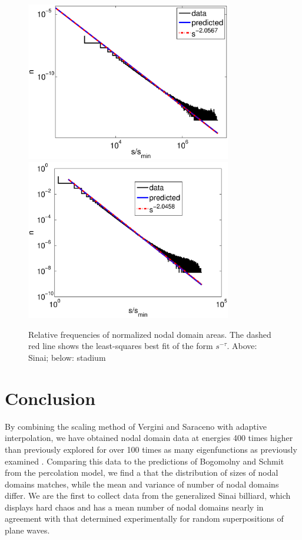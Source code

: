 \documentclass{report}
\begin{document}
\begin{figure}
  \begin{center}
    \includegraphics[width=0.8\textwidth]{figs/results/qugrs_1000_to_1100_sizes.eps}
    \includegraphics[width=0.8\textwidth]{figs/results/qust_700_to_900_sizes_0.1_sampled.eps}
    \caption{Relative frequencies of normalized nodal domain areas. The dashed red line shows the least-squares best fit of the form $s^{-\tau}$. Above: Sinai; below: stadium}
    \label{fig:area}
  \end{center}
\end{figure}

\chapter{Conclusion}
By combining the scaling method of Vergini and Saraceno \cite{vergini} with adaptive interpolation, we have obtained nodal domain data at energies 400 times higher than previously explored for over 100 times as many eigenfunctions as previously examined \cite{bogomolny07}. Comparing this data to the predictions of Bogomolny and Schmit \cite{bogomolny} from the percolation model, we find a that the distribution of sizes of nodal domains matches, while the mean and variance of number of nodal domains differ. We are the first to collect data from the generalized Sinai billiard, which displays hard chaos and has a mean number of nodal domains nearly in agreement with that determined experimentally for random superpositions of plane waves.
\end{document}
